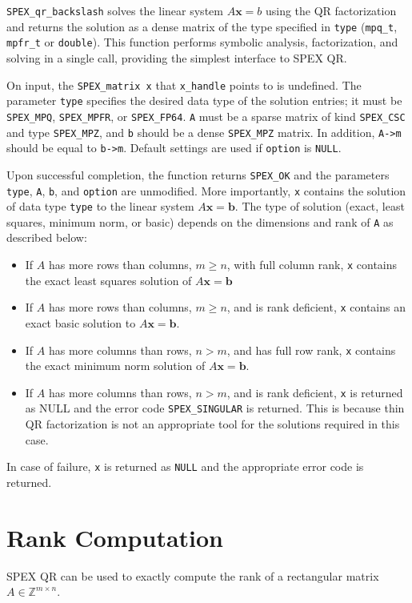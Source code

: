 \documentclass[12pt,oneside]{book}
\theoremstyle{definition}
\renewcommand{\b}{\mathbf{b}}
\newcommand{\x}{\mathbf{x}}
\begin{document}
\verb|SPEX_qr_backslash| solves the linear system $A \x = b$ using the QR factorization and returns the solution as a dense matrix of the type specified in \verb|type| (\verb|mpq_t|, \verb|mpfr_t| or \verb|double|). This function performs symbolic analysis, factorization, and solving in a single call, providing the simplest interface to SPEX QR.

On input, the \verb|SPEX_matrix x| that \verb|x_handle| points to is undefined. The parameter \verb|type| specifies the desired data type of the solution entries; it must be \verb|SPEX_MPQ|, \verb|SPEX_MPFR|, or \verb|SPEX_FP64|. \verb|A| must be a sparse matrix of kind \verb|SPEX_CSC| and type \verb|SPEX_MPZ|, and \verb|b| should be a dense \verb|SPEX_MPZ| matrix. In addition, \verb|A->m| should be equal to \verb|b->m|.  
Default settings are used if \verb|option| is \verb|NULL|.

Upon successful completion, the function returns \verb|SPEX_OK| and the parameters \verb|type|, \verb|A|, \verb|b|, and \verb|option| are unmodified. More importantly, \verb|x| contains the solution of data type \verb|type| to the linear system $A\x=\b$. The type of solution (exact, least squares, minimum norm, or
basic) depends on the dimensions and rank of \verb|A| as described below:

\begin{itemize}
    \item If $A$ has more rows than columns, $m \geq n$, with full column rank, \verb|x| contains the exact least squares solution of $A \x = \b$
    \item If $A$ has more rows than columns, $m \geq n$, and is rank deficient, \verb|x| contains an exact basic solution to $A \x = \b$.
    \item If $A$ has more columns than rows, $n > m$, and has full row rank, \verb|x| contains the exact minimum norm solution of $A \x = \b$.
    \item If $A$ has more columns than rows, $n > m$, and is rank deficient, \verb|x| is returned as NULL and the error code \verb|SPEX_SINGULAR| is returned. This is because thin QR factorization is not an appropriate tool for the solutions required in this case.
\end{itemize}

In case of failure, \verb|x| is returned as \verb|NULL| and the appropriate error code is returned.

\section{Rank Computation}
SPEX QR can be used to exactly compute the rank of a rectangular matrix $A \in
\mathbb{Z}^{m \times n}$.
\end{document}
